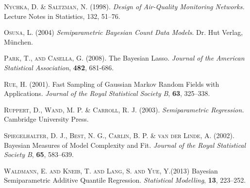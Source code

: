 \documentclass[11pt,a4paper,twoside]{bayesxarticle}
\begin{document}
\begin{thebibliography}{99}
 {\scshape Nychka, D. \& Saltzman, N.} (1998).
 {\it Design of Air-Quality Monitoring Networks.}
 Lecture Notes in Statistics, 132, 51--76.

 {\scshape Osuna, L.} (2004)
 {\it Semiparametric Bayesian Count Data Models}.
 Dr. Hut Verlag, M\"{u}nchen.

 {\scshape Park, T., and Casella, G.} (2008). The Bayesian Lasso.
 {\it Journal of the American Statistical Association}, {\bf 482}, 681-686.

 {\scshape Rue, H.} (2001).
 Fast Sampling of Gaussian Markov Random Fields with Applications.
 {\it Journal of the Royal Statistical Society B}, {\bf 63}, 325--338.

 {\scshape Ruppert, D., Wand, M. P. \& Carroll, R. J.} (2003).
 {\it Semiparametric Regression.}
 Cambridge University Press.

 {\scshape Spiegelhalter, D. J., Best, N. G., Carlin, B. P. \& van der Linde, A.} (2002).
 Bayesian Measures of Model Complexity and Fit.
 {\it Journal of the Royal Statistical Society B}, {\bf 65}, 583--639.

{\scshape Waldmann, E. and Kneib, T. and Lang, S. and Yue, Y.}(2013)
Bayesian Semiparametric Additive  Quantile Regression.
{\it Statistical Modelling}, {\bf 13}, 223--252.



\end{thebibliography}


\hypertarget{index}{}
\end{document}
